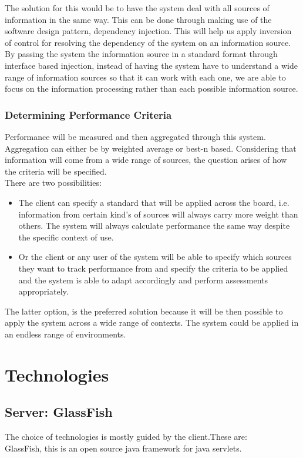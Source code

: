 \documentclass[a4paper,12pt]{article}
\begin{document}
The solution for this would be to have the system deal with all sources of information in the same way. This can be done through making use of the software design pattern, dependency injection. This will help us apply inversion of control for resolving the dependency of the system on an information source. By passing the system the information source in a standard format through interface based injection, instead of having the system have to understand a wide range of information sources so that it can work with each one, we are able to focus on the information processing rather than each possible information source.

\subsubsection{Determining Performance Criteria}
Performance will be measured and then aggregated through this system. Aggregation can either be by weighted average or best-n based. Considering that information will come from a wide range of sources, the question arises of how the criteria will be specified. \\
There are two possibilities:
\begin{itemize}
\item The client can specify a standard that will be applied across the board, i.e. information from certain kind's of sources will always carry more weight than others. The system will always calculate performance the same way despite the specific context of use.
\item Or the client or any user of the system will be able to specify which sources they want to track performance from and specify the criteria to be applied and the system is able to adapt accordingly and perform assessments appropriately. 
\end{itemize}
The latter option, is the preferred solution because it will be then possible to apply the system across a wide range of contexts. The system could be applied in an endless range of environments.
\section{Technologies}
\subsection{Server: GlassFish}
The choice of technologies is mostly guided by the client.These are:\\
GlassFish, this is an open source java framework for java servlets.
\end{document}
